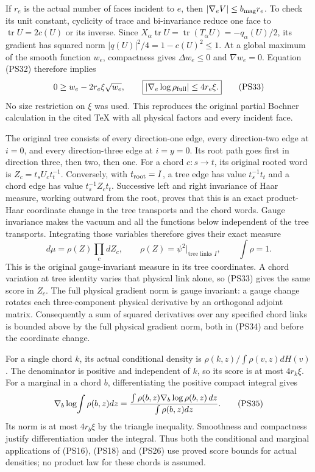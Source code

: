 \documentclass[11pt]{article}
\begin{document}
If \(r_e\) is the actual number of faces incident to \(e\), then
\(|\nabla_eV|\le b_{\rm mag}r_e\). To check its unit constant,
cyclicity of trace and bi-invariance reduce one face to
\(\operatorname{tr}U=2c(U)\) or its inverse. Since
\(X_\alpha\operatorname{tr}U=\operatorname{tr}(T_\alpha U)
=-q_\alpha(U)/2\), its gradient has squared norm
\(|q(U)|^2/4=1-c(U)^2\le1\).
At a global maximum of the smooth function \(w_e\), compactness
gives \(\Delta w_e\le0\) and \(\nabla w_e=0\). Equation (PS32)
therefore implies
\[
 0\ge w_e-2r_e\xi\sqrt{w_e},\qquad
 \boxed{|\nabla_e\log\rho_{\rm full}|\le4r_e\xi.}
 \tag{PS33}
\]
No size restriction on \(\xi\) was used. This reproduces the
original partial Bochner calculation in the cited TeX with all
physical factors and every incident face.

The original tree consists of every direction-one edge, every
direction-two edge at \(i=0\), and every direction-three edge at
\(i=y=0\). Its root path goes first in direction three, then two,
then one. For a chord \(c:s\to t\), its original rooted word is
\(Z_c=t_sU_ct_t^{-1}\). Conversely, with \(t_{\rm root}=I\),
a tree edge has value \(t_s^{-1}t_t\) and a chord edge has value
\(t_s^{-1}Z_ct_t\). Successive left and right invariance of Haar
measure, working outward from the root, proves that this is an
exact product-Haar coordinate change in the tree transports and
the chord words. Gauge invariance makes the vacuum and all the
functions below independent of the tree transports. Integrating
those variables therefore gives their exact measure
\[
 d\mu=\rho(Z)\prod_c dZ_c,\qquad
 \rho(Z)=\psi^2\big|_{\text{tree links }I},\qquad\int\rho=1.
 \tag{PS34}
\]
This is the original gauge-invariant measure in its tree
coordinates. A chord variation at tree identity varies that
physical link alone, so (PS33) gives the same score in \(Z_c\).
The full physical gradient norm is gauge invariant: a gauge
change rotates each three-component physical derivative by an
orthogonal adjoint matrix. Consequently a sum of squared
derivatives over any specified chord links is bounded above by the
full physical gradient norm, both in (PS34) and before the
coordinate change.

For a single chord \(k\), its actual conditional density is
\(\rho(k,z)/\int\rho(v,z)dH(v)\). The denominator is positive
and independent of \(k\), so its score is at most \(4r_k\xi\).
For a marginal in a chord \(b\), differentiating the positive
compact integral gives
\[
 \nabla_b\log\!\int\rho(b,z)dz
 ={\int\rho(b,z)\nabla_b\log\rho(b,z)\,dz
                \over\int\rho(b,z)dz}.
 \tag{PS35}
\]
Its norm is at most \(4r_b\xi\) by the triangle inequality.
Smoothness and compactness justify differentiation under the
integral. Thus both the conditional and marginal applications of
(PS16), (PS18) and (PS26) use proved score bounds for actual
densities; no product law for these chords is assumed.
\end{document}

